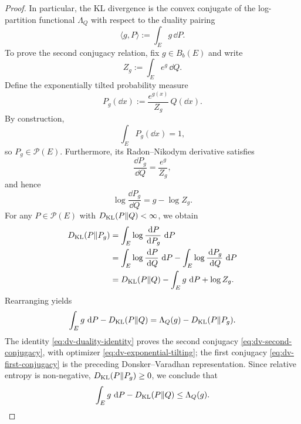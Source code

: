 \documentclass[12pt,a4paper,oneside]{book}
\begin{document}
\begin{proof}
In particular, the KL divergence is the convex conjugate of the log-partition functional $\Lambda_Q$ with respect to the
duality pairing
\begin{equation*}
    \langle g,P\rangle := \int_E g\,\dd P.
\end{equation*}
To prove the second conjugacy relation, fix $g\in B_b(E)$ and write
\begin{equation*}
    Z_g:=\int_E e^g\,\dd Q.
\end{equation*}
Define the exponentially tilted probability measure
\begin{equation*}
    P_g(\dd x) := \frac{e^{g(x)}}{Z_g}\,Q(\dd x).
\end{equation*}
By construction,
\begin{equation*}
    \int_E P_g(\dd x)=1,
\end{equation*}
so $P_g\in\mathcal P(E)$. Furthermore, its Radon--Nikodym derivative satisfies
\begin{equation*}
    \frac{\dd P_g}{\dd Q} = \frac{e^g}{Z_g},
\end{equation*}
and hence
\begin{equation*}
    \log\frac{\dd P_g}{\dd Q} = g-\log Z_g.
\end{equation*}
For any $P\in\mathcal P(E)$ with $D_{\mathrm{KL}}(P\Vert Q)<\infty$, we obtain
\begin{equation*}
    \begin{aligned}
    D_{\mathrm{KL}}(P\Vert P_g)
    &= \int_E\log\frac{\,\mathrm{d} P}{\,\mathrm{d} P_g}\,\,\mathrm{d} P\\
    &= \int_E\log\frac{\,\mathrm{d} P}{\,\mathrm{d} Q}\,\,\mathrm{d} P - \int_E\log\frac{\,\mathrm{d} P_g}{\,\mathrm{d} Q}\,\,\mathrm{d} P\\
    &= D_{\mathrm{KL}}(P\Vert Q) - \int_E g\,\,\mathrm{d} P + \log Z_g.
    \end{aligned}
\end{equation*}
Rearranging yields
\begin{equation}
    \int_E g\,\,\mathrm{d} P-D_{\mathrm{KL}}(P\Vert Q) = \Lambda_Q(g)-D_{\mathrm{KL}}(P\Vert P_g).
    \label{eq:dv-duality-identity}
\end{equation}
The identity \eqref{eq:dv-duality-identity} proves the second conjugacy \eqref{eq:dv-second-conjugacy},
with optimizer \eqref{eq:dv-exponential-tilting}; the first conjugacy \eqref{eq:dv-first-conjugacy}
is the preceding Donsker--Varadhan representation.
Since relative entropy is non-negative, $D_{\mathrm{KL}}(P\Vert P_g)\geq0$, we conclude that
\begin{equation*}
    \int_E g\,\,\mathrm{d} P-D_{\mathrm{KL}}(P\Vert Q)
    \leq\Lambda_Q(g).
\end{equation*}

\end{proof}
\end{document}
